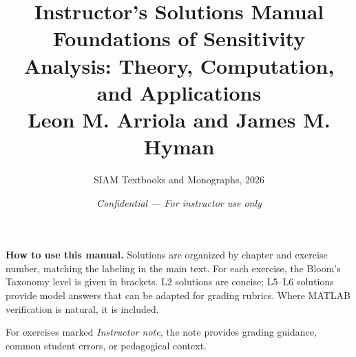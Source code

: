 \documentclass[12pt]{article}
\title{\textbf{Instructor's Solutions Manual}\\[6pt]
       \large Foundations of Sensitivity Analysis: Theory, Computation, and Applications\\[4pt]
       \normalsize Leon M. Arriola and James M. Hyman}
\author{SIAM Textbooks and Monographs, 2026}
\date{\textit{Confidential --- For instructor use only}}
\begin{document}
\maketitle
\tableofcontents
\clearpage

\noindent\textbf{How to use this manual.}
Solutions are organized by chapter and exercise number, matching the
labeling in the main text.  For each exercise, the Bloom's Taxonomy
level is given in brackets.  L2 solutions are concise; L5--L6 solutions
provide model answers that can be adapted for grading rubrics.
Where MATLAB verification is natural, it is included.

\medskip
\noindent For exercises marked \textit{Instructor note}, the note
provides grading guidance, common student errors, or pedagogical context.

\clearpage
\end{document}
